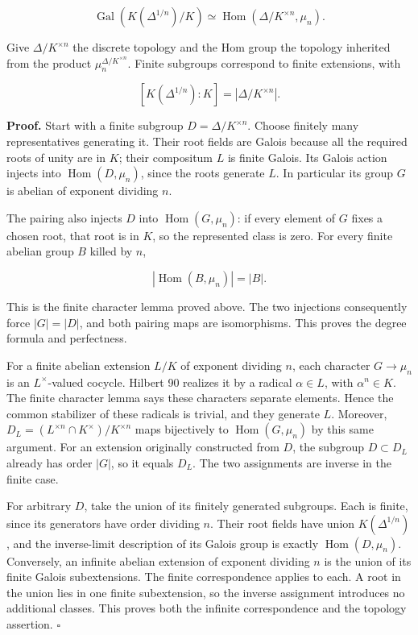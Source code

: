 \documentclass[11pt,a4paper]{article}
\begin{document}
\[
\operatorname{Gal}(K(\Delta^{1/n})/K)
\simeq\operatorname{Hom}(\Delta/K^{\times n},\mu_n).
\]

Give \(\Delta/K^{\times n}\) the discrete topology and the Hom group the
topology inherited from the product \(\mu_n^{\Delta/K^{\times n}}\).
Finite subgroups correspond to finite extensions, with

\[
[K(\Delta^{1/n}):K]=|\Delta/K^{\times n}|.
\]

\textbf{Proof.} Start with a finite subgroup \(D=\Delta/K^{\times n}\).
Choose finitely many representatives generating it. Their root fields
are Galois because all the required roots of unity are in \(K\); their
compositum \(L\) is finite Galois. Its Galois action injects into
\(\operatorname{Hom}(D,\mu_n)\), since the roots generate \(L\). In
particular its group \(G\) is abelian of exponent dividing \(n\).

The pairing also injects \(D\) into \(\operatorname{Hom}(G,\mu_n)\): if
every element of \(G\) fixes a chosen root, that root is in \(K\), so
the represented class is zero. For every finite abelian group \(B\)
killed by \(n\),

\[
|\operatorname{Hom}(B,\mu_n)|=|B|.
\]

This is the finite character lemma proved above. The two injections
consequently force \(|G|=|D|\), and both pairing maps are isomorphisms.
This proves the degree formula and perfectness.

For a finite abelian extension \(L/K\) of exponent dividing \(n\), each
character \(G\to\mu_n\) is an \(L^\times\)-valued cocycle. Hilbert 90
realizes it by a radical \(\alpha\in L\), with \(\alpha^n\in K\). The
finite character lemma says these characters separate elements. Hence
the common stabilizer of these radicals is trivial, and they generate
\(L\). Moreover, \(D_L=(L^{\times n}\cap K^\times)/K^{\times n}\) maps
bijectively to \(\operatorname{Hom}(G,\mu_n)\) by this same argument.
For an extension originally constructed from \(D\), the subgroup
\(D\subset D_L\) already has order \(|G|\), so it equals \(D_L\). The
two assignments are inverse in the finite case.

For arbitrary \(D\), take the union of its finitely generated subgroups.
Each is finite, since its generators have order dividing \(n\). Their
root fields have union \(K(\Delta^{1/n})\), and the inverse-limit
description of its Galois group is exactly
\(\operatorname{Hom}(D,\mu_n)\). Conversely, an infinite abelian
extension of exponent dividing \(n\) is the union of its finite Galois
subextensions. The finite correspondence applies to each. A root in the
union lies in one finite subextension, so the inverse assignment
introduces no additional classes. This proves both the infinite
correspondence and the topology assertion. \(\square\)
\end{document}
